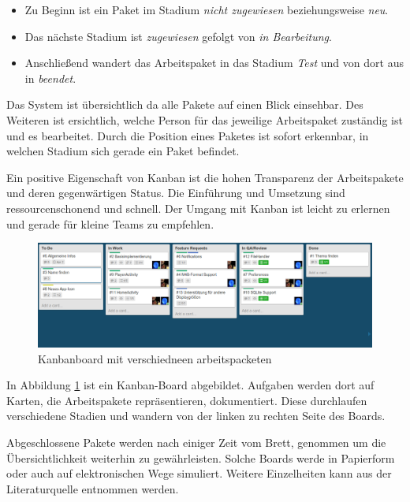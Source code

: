 \begin{itemize}
	\item Zu Beginn ist ein Paket im Stadium \textit{nicht zugewiesen} beziehungsweise \textit{neu}.
	\item Das nächste Stadium ist \textit{zugewiesen} gefolgt von \textit{in Bearbeitung}.
	\item Anschließend wandert das Arbeitspaket in das Stadium \textit{Test} und von dort aus in \textit{beendet}.
\end{itemize}

Das System ist übersichtlich da alle Pakete auf einen Blick einsehbar. Des Weiteren ist ersichtlich, welche Person für das jeweilige Arbeitspaket zuständig ist und es bearbeitet. Durch die Position eines Paketes ist sofort erkennbar, in welchen Stadium sich gerade ein Paket befindet.

Ein positive Eigenschaft von Kanban ist die hohen Transparenz der Arbeitspakete und deren gegenwärtigen Status. Die Einführung und Umsetzung sind ressourcenschonend und schnell. Der Umgang mit Kanban ist leicht zu erlernen und gerade für kleine Teams zu empfehlen.

\begin{figure}
\begin{center}
\includegraphics[scale=0.35]{images/kanban}
\caption{Kanbanboard mit verschiedneen arbeitspacketen}
\label{kanban}
\end{center}
\end{figure}

In Abbildung \ref{kanban} ist ein Kanban-Board abgebildet. Aufgaben werden dort auf Karten, die Arbeitspakete repräsentieren, dokumentiert. Diese durchlaufen verschiedene Stadien und wandern von der linken zu rechten Seite des Boards.

Abgeschlossene Pakete werden nach einiger Zeit vom Brett, genommen um die Übersichtlichkeit weiterhin zu gewährleisten. Solche Boards werde in Papierform oder auch auf elektronischen Wege simuliert. Weitere Einzelheiten kann aus der Literaturquelle \cite{9783898647304} entnommen werden.

